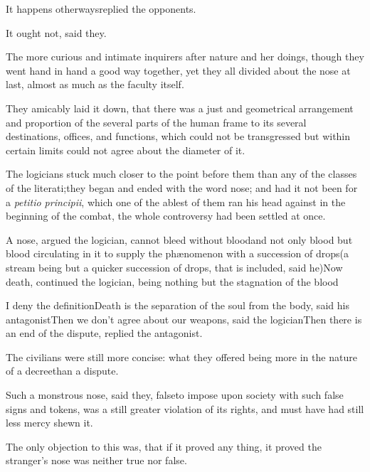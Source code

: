 \documentclass{article}
\begin{document}
\tsh It happens otherways\tsk replied the
opponents.\tsh

It ought not, said they.

The more curious and intimate inquirers after nature and her
doings, though they went hand in hand a good way together,
yet they all divided about the nose at last, almost as much
as the faculty itself.

They amicably laid it down, that there was a just and
geometrical arrangement and proportion of the several parts of the
human frame to its several destinations, offices, and functions,
which could not be transgressed but within certain limits\tsk
{}
could not agree about the diameter of it.

The logicians stuck much closer to the point before them than
any of the classes of the literati;\tsh they began and
ended with the word nose; and had it not been for a \textit{petitio
principii}, which one of the ablest of them ran his head against
in the beginning of the combat, the whole controversy had been
settled at once.

A nose, argued the logician, cannot bleed without
blood\tsk and not only blood
\tsk but blood circulating in it to
supply the phænomenon with a succession of drops\tsk (a
stream being but a quicker succession of drops, that is included,
said he)\tsk Now death, continued the logician, being
nothing but the stagnation of the blood\tsh

I deny the definition\tsh Death is the separation of
the soul from the body, said his antagonist\tsk Then we
don’t agree about our weapons, said the
logician\tsk Then there is an end of the dispute, replied the
antagonist.

The civilians were still more concise: what they offered being
more in the nature of a decree\tsk than a dispute.

\tsk Such a monstrous nose, said they, 
false\tsk to impose upon society with such false signs and
tokens, was a still greater violation of its rights, and must have
had still less mercy shewn it.

The only objection to this was, that\break
if it proved any thing, it proved the\break
stranger’s nose was neither true nor false.
\end{document}
